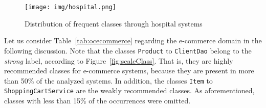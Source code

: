 \begin{figure}[!h]
\centering
\texttt{[image: img/hospital.png]}
\caption{Distribution of frequent classes through hospital systems}
\label{fig:hospital}
\end{figure}

\newpage
Let us consider Table~\ref{tab:ocecommerce} regarding the e-commerce domain in the following discussion. Note that the classes  \texttt{Product} to \texttt{ClientDao} belong to the \textit{strong} label, according to Figure~\ref{fig:scaleClass}. That is, they are highly recommended classes for e-commerce systems, because they are present in more than 50\% of the analyzed systems. In addition, the classes  \texttt{Item} to \texttt{ShoppingCartService} are the weakly recommended classes. As aforementioned, classes with less than 15\% of the occurrences were omitted.

